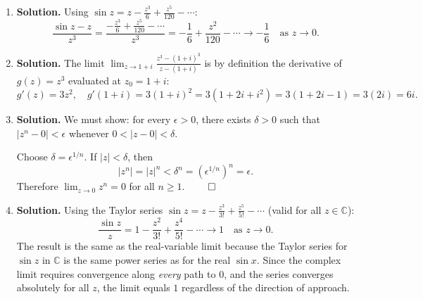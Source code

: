 \begin{enumerate}
\textbf{(a)} $\displaystyle\lim_{z \to 0} z^3 = 0^3 = 0.$ (Direct substitution; $z^3$ is continuous.)

\textbf{(b)} $\displaystyle\lim_{z \to 0} \frac{\sin z}{z}.$ Using the Taylor series $\sin z = z - \frac{z^3}{3!} + \cdots$:
\[
\frac{\sin z}{z} = 1 - \frac{z^2}{3!} + \cdots \to 1 \quad \text{as } z \to 0.
\]

\textbf{(c)} $\displaystyle\lim_{z \to 0} \frac{e^z - 1}{z}.$ Using $e^z = 1 + z + \frac{z^2}{2!} + \cdots$:
\[
\frac{e^z - 1}{z} = 1 + \frac{z}{2!} + \cdots \to 1 \quad \text{as } z \to 0.
\]

\textbf{(d)} $\displaystyle\lim_{z \to 0} \frac{1 - \cos z}{z^2}.$ Using $\cos z = 1 - \frac{z^2}{2!} + \frac{z^4}{4!} - \cdots$:
\[
\frac{1 - \cos z}{z^2} = \frac{1}{2} - \frac{z^2}{4!} + \cdots \to \frac{1}{2} \quad \text{as } z \to 0.
\]

\item \textbf{Solution.}
Using $\sin z = z - \frac{z^3}{6} + \frac{z^5}{120} - \cdots$:
\[
\frac{\sin z - z}{z^3} = \frac{-\frac{z^3}{6} + \frac{z^5}{120} - \cdots}{z^3} = -\frac{1}{6} + \frac{z^2}{120} - \cdots \to -\frac{1}{6} \quad \text{as } z \to 0.
\]

\item \textbf{Solution.}
The limit $\displaystyle\lim_{z \to 1+i} \frac{z^3 - (1+i)^3}{z - (1+i)}$ is by definition the derivative of $g(z) = z^3$ evaluated at $z_0 = 1+i$:
\[
g'(z) = 3z^2, \quad g'(1+i) = 3(1+i)^2 = 3(1 + 2i + i^2) = 3(1 + 2i - 1) = 3(2i) = 6i.
\]

\item \textbf{Solution.}
We must show: for every $\epsilon > 0$, there exists $\delta > 0$ such that $|z^n - 0| < \epsilon$ whenever $0 < |z - 0| < \delta$.

Choose $\delta = \epsilon^{1/n}$. If $|z| < \delta$, then
\[
|z^n| = |z|^n < \delta^n = (\epsilon^{1/n})^n = \epsilon.
\]
Therefore $\displaystyle\lim_{z \to 0} z^n = 0$ for all $n \geq 1$. $\qed$

\item \textbf{Solution.}
Using the Taylor series $\sin z = z - \frac{z^3}{3!} + \frac{z^5}{5!} - \cdots$ (valid for all $z \in \mathbb{C}$):
\[
\frac{\sin z}{z} = 1 - \frac{z^2}{3!} + \frac{z^4}{5!} - \cdots \to 1 \quad \text{as } z \to 0.
\]
The result is the same as the real-variable limit because the Taylor series for $\sin z$ in $\mathbb{C}$ is the same power series as for the real $\sin x$. Since the complex limit requires convergence along \emph{every} path to $0$, and the series converges absolutely for all $z$, the limit equals $1$ regardless of the direction of approach.


\end{enumerate}
